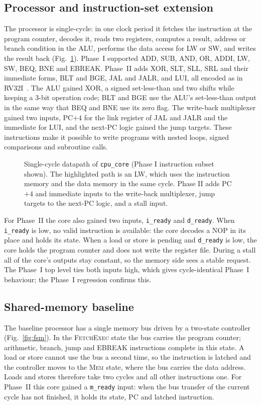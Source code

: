 \documentclass[conference]{IEEEtran}
\begin{document}
\subsection{Processor and instruction-set extension}
The processor is single-cycle: in one clock period it fetches the instruction
at the program counter, decodes it, reads two registers, computes a result,
address or branch condition in the ALU, performs the data access for LW or
SW, and writes the result back (Fig.~\ref{fig:datapath}). Phase~I supported
ADD, SUB, AND, OR, ADDI, LW, SW, BEQ, BNE and EBREAK. Phase~II adds XOR, SLT,
SLL, SRL and their immediate forms, BLT and BGE, JAL and JALR, and LUI, all
encoded as in RV32I~\cite{riscv_isa}. The ALU gained XOR, a signed
set-less-than and two shifts while keeping a 3-bit operation code; BLT and
BGE use the ALU's set-less-than output in the same way that BEQ and BNE use
its zero flag. The write-back multiplexer gained two inputs, PC$+4$ for the
link register of JAL and JALR and the immediate for LUI, and the next-PC
logic gained the jump targets. These instructions make it possible to write
programs with nested loops, signed comparisons and subroutine calls.

\begin{figure}[t]
\centering
\resizebox{\columnwidth}{!}{}
\caption{Single-cycle datapath of \texttt{cpu\_core} (Phase I instruction subset shown). The highlighted path is an LW, which uses the instruction memory and the data memory in the same cycle. Phase II adds PC$+4$ and immediate inputs to the write-back multiplexer, jump targets to the next-PC logic, and a stall input.}
\label{fig:datapath}
\end{figure}

For Phase~II the core also gained two inputs, \texttt{i\_ready} and
\texttt{d\_ready}. When \texttt{i\_ready} is low, no valid instruction is
available: the core decodes a NOP in its place and holds its state. When a
load or store is pending and \texttt{d\_ready} is low, the core holds the
program counter and does not write the register file. During a stall all of
the core's outputs stay constant, so the memory side sees a stable request.
The Phase~I top level ties both inputs high, which gives cycle-identical
Phase~I behaviour; the Phase~I regression confirms this.

\subsection{Shared-memory baseline}
The baseline processor has a single memory bus driven by a two-state
controller (Fig.~\ref{fig:fsm}). In the \textsc{FetchExec} state the bus
carries the program counter; arithmetic, branch, jump and EBREAK
instructions complete in this state. A load or store cannot use the bus a
second time, so the instruction is latched and the controller moves to the
\textsc{Mem} state, where the bus carries the data address. Loads and stores
therefore take two cycles and all other instructions one. For Phase~II this
core gained a \texttt{m\_ready} input: when the bus transfer of the current
cycle has not finished, it holds its state, PC and latched instruction.
\end{document}

